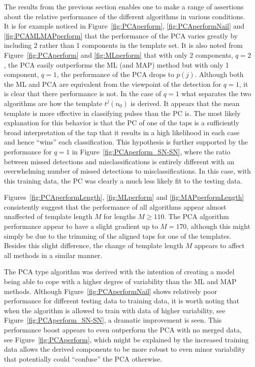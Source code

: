 The results from the previous section enables one to make a range of assertions about the relative performance of the different algorithms in various conditions. It is for example noticed in Figure~\ref{fig:PCAperform}, \ref{fig:PCAperformNail} and \ref{fig:PCAMLMAPperform} that the performance of the PCA varies greatly by including 2 rather than 1 components in the template set. It is also noted from Figure~\ref{fig:PCAperform} and \ref{fig:MLperform} that with only 2 components, $q=2$, the PCA easily outperforms the ML (and MAP) method but with only 1 component, $q=1$, the performance of the PCA drops to $p(j)$. Although both the ML and PCA are equivalent from the viewpoint of the detection for $q=1$, it is clear that there performance is not. In the case of $q=1$ what separates the two algorithms are how the template $t^j(n_0)$ is derived. It appears that the mean template is more effective in classifying pulses than the PC is. The most likely explanation for this behavior is that the PC of one of the taps is a sufficiently broad interpretation of the tap that it results in a high likelihood in each case and hence ``wins'' each classification. This hypothesis is further supported by the performance for $q=1$ in Figure~\ref{fig:PCAperform_SN-SN}, where the ratio between missed detections and misclassifications is entirely different with an overwhelming number of missed detections to misclassifications. In this case, with this training data, the PC was clearly a much less likely fit to the testing data.

Figures~\ref{fig:PCAperformLength}, \ref{fig:MLperform} and \ref{fig:MAPperformLength} consistently suggest that the performance of all algorithms appear almost unaffected of template length $M$ for lengths $M\geq110$. The PCA algorithm performance appear to have a slight gradient up to $M=170$, although this might simply be due to the trimming of the aligned taps for one of the templates. Besides this slight difference, the change of template length $M$ appears to affect all methods in a similar manner.

The PCA type algorithm was derived with the intention of creating a model being able to cope with a higher degree of variability than the ML and MAP methods. Although Figure~\ref{fig:PCAperformNail} shows relatively poor performance for different testing data to training data, it is worth noting that when the algorithm is allowed to train with data of higher variability, see Figure~\ref{fig:PCAperform_SN-SN}, a dramatic improvement is seen. This performance boost appears to even outperform the PCA with no merged data, see Figure~\ref{fig:PCAperform}, which might be explained by the increased training data allows the derived components to be more robust to even minor variability that potentially could ``confuse'' the PCA otherwise.

